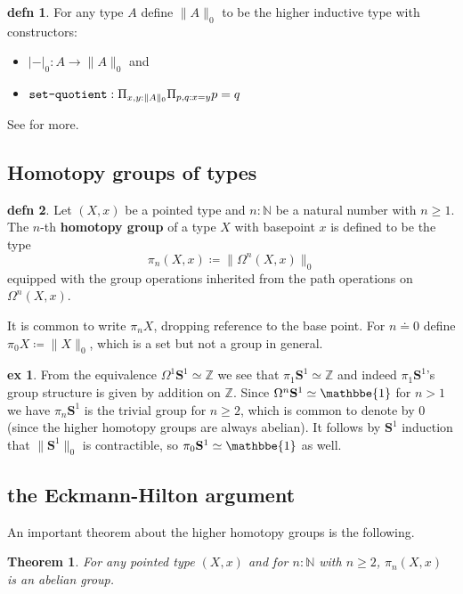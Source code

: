 \documentclass{amsart}
\theoremstyle{theorem}
\newtheorem*{thm}{Theorem}
\theoremstyle{definition}
\newtheorem*{defn}{defn}
\newtheorem*{ex}{ex}
\theoremstyle{remark}
\newcommand{\0}{\mathbbe{0}}
\newcommand{\1}{\mathbbe{1}}
\newcommand{\2}{\mathbbe{2}}
\newcommand{\3}{\mathbbe{3}}
\newcommand{\4}{\mathbbe{4}}
\newcommand{\NN}{\mathbb{N}}
\newcommand{\ZZ}{\mathbb{Z}}
\newcommand{\term}[1]{{\textup{\texttt{#1}}}}
\newcommand{\set}[1]{\|{#1}\|_0}
\newcommand{\Sone}{\mathbf{S}^1}
\begin{document}
\begin{defn} For any type $A$ define $\set{A}$ to be the higher inductive type with constructors:
\begin{itemize}
\item $|-|_0 : A \to \set{A}$ and
\item $\term{set-quotient} : \Pi_{x,y: \set{A}} \Pi_{p,q: x=y} p =q$
\end{itemize}
\end{defn}

See \cite[6.9]{book-hott} for more.


\subsection*{Homotopy groups of types}

\begin{defn} Let $(X,x)$ be a pointed type and $n : \NN$ be a natural number with $n \geq 1$. The $n$-th \textbf{homotopy group} of a type $X$ with basepoint $x$ is defined to be the type
\[
\pi_n(X,x) \coloneq \set{ \Omega^n(X,x)}
\]
equipped with the group operations inherited from the path operations on $\Omega^n(X,x)$.
\end{defn}

It is common to write $\pi_nX$, dropping reference to the base point. For $n \doteq 0$ define $\pi_0X \coloneq \set{X}$, which is a set but not a group in general.

\begin{ex} From the equivalence $\Omega^1\Sone \simeq \ZZ$ we see that $\pi_1\Sone \simeq \ZZ$ and indeed $\pi_1\Sone$'s group structure is given by addition on $\ZZ$. Since $\Omega^n\Sone \simeq \1$ for $n > 1$ we have $\pi_n\Sone$ is the trivial group for $n \geq 2$, which is common to denote by $0$ (since the higher homotopy groups are always abelian). It follows by $\Sone$ induction that $\set{\Sone}$ is contractible, so $\pi_0\Sone \simeq \1$ as well.
\end{ex}

\subsection*{the Eckmann-Hilton argument}

An important theorem about the higher homotopy groups is the following.

\begin{thm} For any pointed type $(X,x)$ and for $n : \NN$ with $n \geq 2$, $\pi_n(X,x)$ is an abelian group.
\end{thm}
\end{document}
